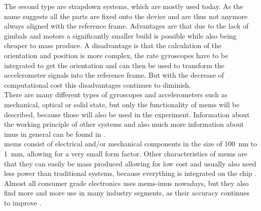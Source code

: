 The second type are strapdown systems, which are mostly used today.
As the name suggests all the parts are fixed onto the device and are thus not anymore always aligned with the reference frame.
Advantages are that due to the lack of gimbals and motors a significantly smaller build is possible while also being cheaper to mass produce.
A disadvantage is that the calculation of the orientation and position is more complex, the rate gyroscopes have to be integrated to get the orientation and can then be used to transform the accelerometer signals into the reference frame.
But with the decrease of computational cost this disadvantages continues to diminish.\\
There are many different types of gyroscopes and accelerometers such as mechanical, optical or solid state, but only the functionality of \gls{mems} will be described, because those will also be used in the experiment.
Information about the working principle of other systems and also much more information about \gls{imu}s in general can be found in \cite{Woodman2007}.\\
\gls{mems} consist of electrical and/or mechanical components in the size of \SI{100}{\nano\metre} to \SI{1}{\milli\metre}, allowing for a very small form factor.
Other characteristics of \gls{mems} are that they can easily be mass produced allowing for low cost and usually also need less power than traditional systems, because everything is integrated on the chip \cite{Shaeffer2013}.
Almost all consumer grade electronics uses \gls{mems}-\gls{imu}s nowadays, but they also find more and more use in many industry segments, as their accuracy continues to improve \cite{Perlmutter2016}.

